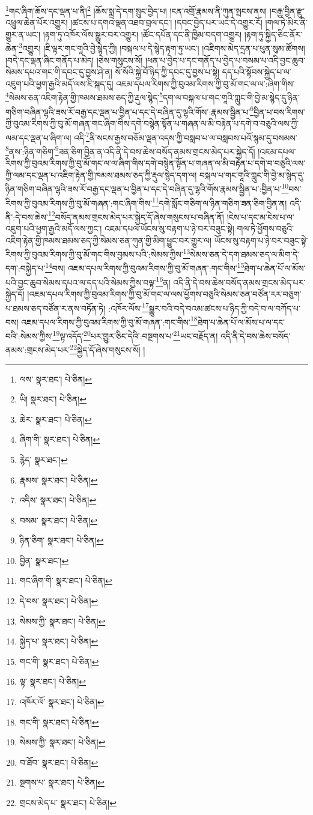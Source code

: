 \footnote{ལས་  སྣར་ཐང་།  པེ་ཅིན། }གང་ཞིག་ཆོས་དང་ལྡན་པ་ནི།\footnote{ཡི།  སྣར་ཐང་།  པེ་ཅིན། } །ཆོས་སྨྲ་དེ་དག་སྲུང་བྱེད་པ། །ངན་འགྲོ་རྣམས་ནི་ཀུན་སྤངས་ནས། །བརྒྱ་བྱིན་རྫུ་འཕྲུལ་ཆེན་པོར་འགྱུར། །ཚངས་པ་དགའ་ལྡན་འཐབ་བྲལ་དང་། །དབང་བྱེད་པར་ཡང་དེ་འགྱུར་རོ། །གལ་ཏེ་མིར་ནི་གྱུར་ན་ཡང་། །རྟག་ཏུ་འཁོར་ལོས་སྒྱུར་བར་འགྱུར། །ཚོང་དཔོན་དང་ནི་ཁྱིམ་བདག་འགྱུར། །རྟག་ཏུ་སྐྱིད་ཅིང་ནོར་ཆེན་\footnote{ཆེར་  སྣར་ཐང་།  པེ་ཅིན། }འགྱུར། །ཇི་ལྟར་གང་གཱའི་བྱེ་སྙེད་ཀྱི། །བསྐལ་པ་དེ་སྙེད་རྟག་ཏུ་ཡང་། །འཇིགས་མེད་དྲན་པ་ཕུན་སུམ་ཚོགས། །བདེ་དང་ལྡན་ཞིང་གནོད་པ་མེད། །ཅེས་གསུངས་སོ། །ཕན་པ་བྱེད་པ་དང་གནོད་པ་བྱེད་པ་བསམ་པ་འདི་བྱང་ཆུབ་སེམས་དཔའ་གང་གི་དབང་དུ་བྱས་ཤེ་ན། སོ་སོའི་སྐྱེ་བོ་ཉིད་ཀྱི་དབང་དུ་བྱས་པ་སྟེ། དད་པའི་སྟོབས་སྐྱེད་པ་ལ་འཇུག་པའི་ཕྱག་རྒྱའི་མདོ་ལས་ཇི་སྐད་དུ། འཇམ་དཔལ་རིགས་ཀྱི་བུའམ་རིགས་ཀྱི་བུ་མོ་གང་ལ་ལ་:ཞིག་གིས་\footnote{ཞིག་གི་  སྣར་ཐང་།  པེ་ཅིན། }སེམས་ཅན་འཇིག་རྟེན་གྱི་ཁམས་ཐམས་ཅད་ཀྱི་རྡུལ་སྙེད་\footnote{རྙེད་  སྣར་ཐང་། }དག་ལ་བསྐལ་པ་གང་གཱའི་ཀླུང་གི་བྱེ་མ་སྙེད་དུ་ཉིན་གཅིག་བཞིན་ལྷའི་ཟས་རོ་བརྒྱ་དང་ལྡན་པ་བྱིན་པ་དང་དེ་བཞིན་དུ་ལྷའི་གོས་:རྣམས་སྦྱིན་པ་\footnote{རྣམས་  སྣར་ཐང་།  པེ་ཅིན། }བྱིན་པ་བས་རིགས་ཀྱི་བུའམ་རིགས་ཀྱི་བུ་མོ་གཞན་གང་ཞིག་གིས་དགེ་བསྙེན་སྟོན་པ་གཞན་ལ་མི་བརྟེན་པ་དགེ་བ་བཅུའི་ལས་ཀྱི་ལམ་དང་ལྡན་པ་ཞིག་ལ། འདི་\footnote{འདིས་  སྣར་ཐང་།  པེ་ཅིན། }ནི་སངས་རྒྱས་བཅོམ་ལྡན་འདས་ཀྱི་བསླབ་པ་ལ་བསླབས་པའོ་སྙམ་དུ་བསམས་\footnote{བསམ་  སྣར་ཐང་།  པེ་ཅིན། }ནས་:ཉིན་གཅིག་\footnote{ཉིན་ཅིག་  སྣར་ཐང་།  པེ་ཅིན། }ཟན་ཅིག་བྱིན་ན་འདི་ནི་དེ་བས་ཆེས་བསོད་ནམས་གྲངས་མེད་པར་སྐྱེད་དོ། །འཇམ་དཔལ་རིགས་ཀྱི་བུའམ་རིགས་ཀྱི་བུ་མོ་གང་ལ་ལ་ཞིག་གིས་དགེ་བསྙེན་སྟོན་པ་གཞན་ལ་མི་བརྟེན་པ་དགེ་བ་བཅུའི་ལས་ཀྱི་ལམ་དང་ལྡན་པ་འཇིག་རྟེན་གྱི་ཁམས་ཐམས་ཅད་ཀྱི་རྡུལ་སྙེད་དག་ལ། བསྐལ་པ་གང་གཱའི་ཀླུང་གི་བྱེ་མ་སྙེད་དུ་ཉིན་གཅིག་བཞིན་ལྷའི་ཟས་རོ་བརྒྱ་དང་ལྡན་པ་བྱིན་པ་དང་དེ་བཞིན་དུ་ལྷའི་གོས་རྣམས་སྦྱིན་པ་:བྱིན་པ་\footnote{བྱིན་  སྣར་ཐང་། }བས་རིགས་ཀྱི་བུའམ་རིགས་ཀྱི་བུ་མོ་གཞན་:གང་ཞིག་གིས་\footnote{གང་ཞིག་གི་  སྣར་ཐང་།  པེ་ཅིན། }དགེ་སློང་གཅིག་ལ་ཉིན་གཅིག་ཟན་ཅིག་བྱིན་ན། འདི་ནི་:དེ་བས་ཆེས་\footnote{དེ་བས་  སྣར་ཐང་།  པེ་ཅིན། }བསོད་ནམས་གྲངས་མེད་པར་སྐྱེད་དོ་ཞེས་གསུངས་པ་བཞིན་ནོ། །ངེས་པ་དང་མ་ངེས་པ་ལ་འཇུག་པའི་ཕྱག་རྒྱའི་མདོ་ལས་ཀྱང་། འཇམ་དཔལ་ཡོངས་སུ་བརྟག་པ་ཉེ་བར་བཟུང་སྟེ། གལ་ཏེ་ཕྱོགས་བཅུའི་འཇིག་རྟེན་གྱི་ཁམས་ཐམས་ཅད་ཀྱི་སེམས་ཅན་ཀུན་གྱི་མིག་ཕྱུང་བར་གྱུར་ལ། ཡོངས་སུ་བརྟག་པ་ཉེ་བར་བཟུང་སྟེ་རིགས་ཀྱི་བུའམ་རིགས་ཀྱི་བུ་མོ་གང་གིས་བྱམས་པའི་:སེམས་ཀྱིས་\footnote{སེམས་ཀྱི་  སྣར་ཐང་།  པེ་ཅིན། }སེམས་ཅན་དེ་དག་ཐམས་ཅད་ལ་མིག་དེ་དག་:བསྐྱེད་པ་\footnote{སྐྱེད་པ་  སྣར་ཐང་།  པེ་ཅིན། }བས། འཇམ་དཔལ་རིགས་ཀྱི་བུའམ་རིགས་ཀྱི་བུ་མོ་གཞན་:གང་གིས་\footnote{གང་གི་  སྣར་ཐང་།  པེ་ཅིན། }ཐེག་པ་ཆེན་པོ་ལ་མོས་པའི་བྱང་ཆུབ་སེམས་དཔའ་ལ་དད་པའི་སེམས་ཀྱིས་བལྟ་\footnote{ལྟ་  སྣར་ཐང་།  པེ་ཅིན། }ན། འདི་ནི་དེ་བས་ཆེས་བསོད་ནམས་གྲངས་མེད་པར་སྐྱེད་དོ། །འཇམ་དཔལ་རིགས་ཀྱི་བུའམ་རིགས་ཀྱི་བུ་མོ་གང་ལ་ལས་ཕྱོགས་བཅུའི་སེམས་ཅན་བཙོན་རར་བཅུག་པ་ཐམས་ཅད་བཙོན་ར་ནས་བཏོན་ཏེ། :འཁོར་ལོས་\footnote{འཁོར་ལོ་  སྣར་ཐང་།  པེ་ཅིན། }སྒྱུར་བའི་བདེ་བའམ་ཚངས་པ་ཉིད་ཀྱི་བདེ་བ་ལ་བཀོད་པ་བས། འཇམ་དཔལ་རིགས་ཀྱི་བུའམ་རིགས་ཀྱི་བུ་མོ་གཞན་:གང་གིས་\footnote{གང་གི་  སྣར་ཐང་།  པེ་ཅིན། }ཐེག་པ་ཆེན་པོ་ལ་མོས་པ་ལ་དང་བའི་:སེམས་ཀྱིས་\footnote{སེམས་ཀྱི་  སྣར་ཐང་།  པེ་ཅིན། }ལྟ་འདོད་\footnote{བ་ཐོབ་  སྣར་ཐང་།  པེ་ཅིན། }པར་གྱུར་ཅིང་དེའི་:བསྔགས་པ་\footnote{སྔགས་པ་  སྣར་ཐང་།  པེ་ཅིན། }ཡང་བརྗོད་ན། འདི་ནི་དེ་བས་ཆེས་བསོད་ནམས་:གྲངས་མེད་པར་\footnote{གྲངས་མེད་པ་  སྣར་ཐང་།  པེ་ཅིན། }སྐྱེད་དོ་ཞེས་གསུངས་སོ། །
